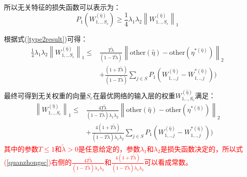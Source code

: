 \documentclass{article}
\begin{document}
所以无关特征的损失函数可以表示为：
\begin{equation}
	P_1(W_{1,.,S_c}^{(\hat{\eta})})\geq \frac{1}{4}\lambda_1\lambda_2\left\|W_{1,.,S_c}^{(\hat{\eta})}\right\|_1
\end{equation}
\par 根据式(\ref*{type2result})可得：
\begin{equation}
	\begin{split}
		\frac{1}{4}\lambda_1\lambda_2\left\|W_{1,.,S_c}^{(\hat{\eta})}\right\|_1\leq&\frac{T\tilde{\lambda}}{(1-T\tilde{\lambda})}\left\|\text{other}(\hat{\eta})-\text{other}(\eta^{*(\hat{\eta})})\right\|_2\\&+\frac{(1+T\tilde{\lambda})}{(1-T\tilde{\lambda})}\sum_{j\in S}P_1(W_{1,.,j}^{(\hat{\eta})}-W_{1,.,j}^{*(\hat{\eta})}))\\
	\end{split}
\end{equation}
最终可得到无关权重的向量$S_c$在最优网络的输入层的权重$W_{1,.,S_c}^{(\hat{\eta})}$满足：
\begin{equation}\label{quanzhongsc}
	\begin{split}
		\left\|W_{1,.,S_c}^{(\hat{\eta})}\right\|_1\leq &\frac{4T\tilde{\lambda}}{(1-T\tilde{\lambda})\lambda_1\lambda_2}\left\|\text{other}(\hat{\eta})-\text{other}(\eta^{*(\hat{\eta})})\right\|_2\\&+\frac{4(1+T\tilde{\lambda})}{(1-T\tilde{\lambda})\lambda_1\lambda_2}\sum_{j\in S}P_1(W_{1,.,j}^{(\hat{\eta})}-W_{1,.,j}^{*(\hat{\eta})}))
	\end{split}
\end{equation}
\textcolor{red}{其中的参数$T\le1$和$\tilde{\lambda}>0$是任意给定的，参数$\lambda_1$和$\lambda_2$是损失函数决定的，所以式(\ref*{quanzhongsc})右侧的$\frac{4T\tilde{\lambda}}{(1-T\tilde{\lambda})\lambda_1\lambda_2}$和$\frac{4(1+T\tilde{\lambda})}{(1-T\tilde{\lambda})\lambda_1\lambda_2}$可以看成常数。}
\end{document}
